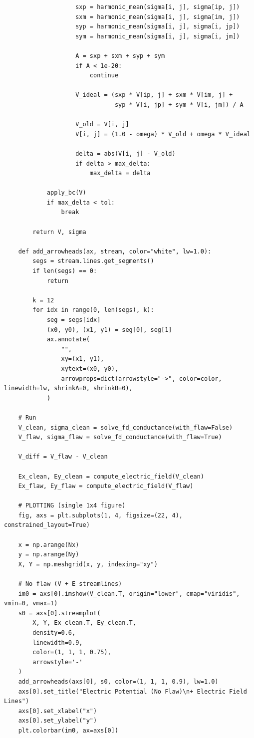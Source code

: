 \documentclass[reprint,amsmath,amssymb,aps]{revtex4-2}
\begin{document}
\begin{lstlisting}
                    sxp = harmonic_mean(sigma[i, j], sigma[ip, j])
                    sxm = harmonic_mean(sigma[i, j], sigma[im, j])
                    syp = harmonic_mean(sigma[i, j], sigma[i, jp])
                    sym = harmonic_mean(sigma[i, j], sigma[i, jm])
    
                    A = sxp + sxm + syp + sym
                    if A < 1e-20:
                        continue
    
                    V_ideal = (sxp * V[ip, j] + sxm * V[im, j] +
                               syp * V[i, jp] + sym * V[i, jm]) / A
    
                    V_old = V[i, j]
                    V[i, j] = (1.0 - omega) * V_old + omega * V_ideal
    
                    delta = abs(V[i, j] - V_old)
                    if delta > max_delta:
                        max_delta = delta
    
            apply_bc(V)
            if max_delta < tol:
                break
    
        return V, sigma
    
    def add_arrowheads(ax, stream, color="white", lw=1.0):
        segs = stream.lines.get_segments()
        if len(segs) == 0:
            return
    
        k = 12  
        for idx in range(0, len(segs), k):
            seg = segs[idx]
            (x0, y0), (x1, y1) = seg[0], seg[1]
            ax.annotate(
                "",
                xy=(x1, y1),
                xytext=(x0, y0),
                arrowprops=dict(arrowstyle="->", color=color, linewidth=lw, shrinkA=0, shrinkB=0),
            )
    
    # Run
    V_clean, sigma_clean = solve_fd_conductance(with_flaw=False)
    V_flaw, sigma_flaw = solve_fd_conductance(with_flaw=True)
    
    V_diff = V_flaw - V_clean
    
    Ex_clean, Ey_clean = compute_electric_field(V_clean)
    Ex_flaw, Ey_flaw = compute_electric_field(V_flaw)
    
    # PLOTTING (single 1x4 figure)
    fig, axs = plt.subplots(1, 4, figsize=(22, 4), constrained_layout=True)
    
    x = np.arange(Nx)   
    y = np.arange(Ny)   
    X, Y = np.meshgrid(x, y, indexing="xy")
    
    # No flaw (V + E streamlines)
    im0 = axs[0].imshow(V_clean.T, origin="lower", cmap="viridis", vmin=0, vmax=1)
    s0 = axs[0].streamplot(
        X, Y, Ex_clean.T, Ey_clean.T,
        density=0.6,
        linewidth=0.9,
        color=(1, 1, 1, 0.75),
        arrowstyle='-'   
    )
    add_arrowheads(axs[0], s0, color=(1, 1, 1, 0.9), lw=1.0)
    axs[0].set_title("Electric Potential (No Flaw)\n+ Electric Field Lines")
    axs[0].set_xlabel("x")
    axs[0].set_ylabel("y")
    plt.colorbar(im0, ax=axs[0])
    

\end{lstlisting}
\end{document}
